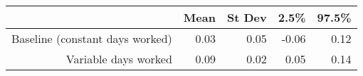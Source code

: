 \begin{tabular}{rrrrr} 
 \hline \hline 
& Mean & St Dev & \hspace{5pt} 2.5\% & 97.5\% \\ 
 \hline 
 Baseline (constant days worked) & 0.03 & 0.05 & -0.06 & 0.12 \\ 
  Variable days worked & 0.09 & 0.02 & 0.05 & 0.14 \\ 
  \hline 
\end{tabular} 
